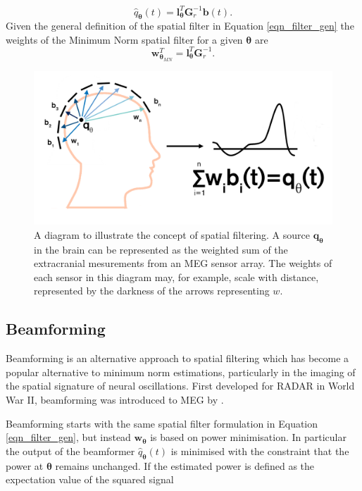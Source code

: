 \begin{equation}
	\hat{q}_\mathbf{\theta}(t) = \mathbf{l}_\mathbf{\theta}^T\mathbf{G}_r^{-1}\mathbf{b}(t).
\end{equation} Given the general definition of the spatial filter in Equation \ref{eqn_filter_gen} the weights of the Minimum Norm spatial filter for a given $\mathbf{\theta}$ are
\begin{equation}\label{eqn_weights_mn}
	\mathbf{w}_{\mathbf{\theta}_{MN}}^T = \mathbf{l}^T_\mathbf{\theta}\mathbf{G}^{-1}_r.  
\end{equation}  
	
\begin{figure}[h!]
	\begin{center}
		\includegraphics[width=0.8\linewidth]{./images/chapter2/Figure_2.png}
		\caption{A diagram to illustrate the concept of spatial filtering. A source $\mathbf{q_\theta}$ in the brain can be represented as the weighted sum of the extracranial mesurements from an MEG sensor array. The weights of each sensor in this diagram may, for example, scale with distance, represented by the darkness of the arrows representing $w$.\label{figure_2_3}}
	\end{center}
\end{figure}

\subsection{Beamforming}

Beamforming is an alternative approach to spatial filtering which has become a popular alternative to minimum norm estimations, particularly in the imaging of the spatial signature of neural oscillations. First developed for RADAR in World War II,  beamforming was introduced to MEG by \cite{Robinson1992}.

Beamforming starts with the same spatial filter formulation in Equation \ref{eqn_filter_gen}, but instead $\mathbf{w_\theta}$ is based on power minimisation. In particular the output of the beamformer $\hat{q}_\mathbf{\theta}(t)$ is minimised with the constraint that the power at $\mathbf{\theta}$ remains unchanged. If the estimated power is defined as the expectation value of the squared signal 

